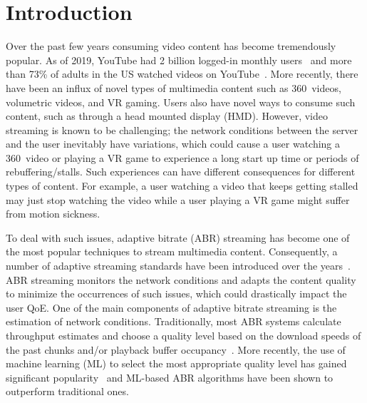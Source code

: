 \documentclass[sigconf,anonymous]{acmart}
\begin{document}
\graphicspath{{figs/}}

\section{Introduction} %

Over the past few years consuming video content has become
tremendously popular. As of 2019, YouTube had 2 billion logged-in
monthly users~\cite{statista} and more than 73\% of adults in the US
watched videos on YouTube~\cite{pew-research}. More recently, there
have been an influx of novel types of multimedia content such as
360\degree~videos, volumetric videos, and VR gaming. Users also have
novel ways to consume such content, such as through a head mounted
display (HMD). 
However, video streaming is
known to be challenging; the network conditions between the server and
the user inevitably have variations, which could cause a user watching
a 360\degree~video or playing a VR game to experience a long start up
time or periods of rebuffering/stalls. Such experiences can have
different consequences for different types of content. For example, a
user watching a video that keeps getting stalled may just stop
watching the video while a user playing a VR game might suffer from
motion sickness.

To deal with such issues, adaptive bitrate (ABR) streaming has become
one of the most popular techniques to stream multimedia
content. Consequently, a number of adaptive streaming standards have
been introduced over the years~\cite{stockhammer:mmsys2011,
  pantos-hls, adobe-hds, microsoft-ss}. ABR streaming monitors the
network conditions and adapts the content quality to minimize the
occurrences of such issues, which could drastically impact the user
QoE. One of the main components of adaptive bitrate streaming is the
estimation of network conditions. Traditionally, most ABR systems
calculate throughput estimates and choose a quality level based on the
download speeds of the past chunks and/or playback buffer
occupancy~\cite{sun:sigcomm2016, spiteri:infocom2016}. More recently,
the use of machine learning (ML) to select the most appropriate
quality level has gained significant popularity~\cite{mao:sigcomm2017,
  yan:nsdi2020} and ML-based ABR algorithms have been shown to
outperform traditional ones.
\end{document}
